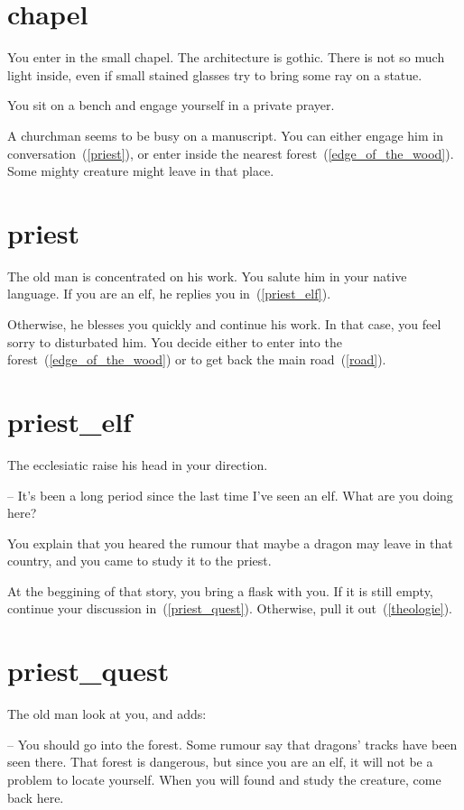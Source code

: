 \section{chapel}

You enter in the small chapel. The architecture is gothic. There is not so much
light inside, even if small stained glasses try to bring some ray on a statue.

You sit on a bench and engage yourself in a private prayer.

A churchman seems to be busy on a manuscript. You can either engage him in
conversation~(\ref{priest}), or enter inside the nearest
forest~(\ref{edge_of_the_wood}). Some mighty creature might leave in that place.

\section{priest}

The old man is concentrated on his work. You salute him in your native language.
If you are an elf, he replies you in~(\ref{priest_elf}).

Otherwise, he blesses you quickly and continue his work. In that case, you feel
sorry to disturbated him. You decide either to enter into the
forest~(\ref{edge_of_the_wood}) or to get back the main road~(\ref{road}).

\section{priest_elf}

The ecclesiatic raise his head in your direction.

-- It's been a long period since the last time I've seen an elf. What are you
doing here?

You explain that you heared the rumour that maybe a dragon may leave in that
country, and you came to study it to the priest.

At the beggining of that story, you bring a flask with you. If it is still
empty, continue your discussion in~(\ref{priest_quest}). Otherwise, pull it
out~(\ref{theologie}).

\section{priest_quest}

The old man look at you, and adds:

-- You should go into the forest. Some rumour say that dragons' tracks have been
seen there. That forest is dangerous, but since you are an elf, it will not be a
problem to locate yourself. When you will found and study the creature, come
back here.

